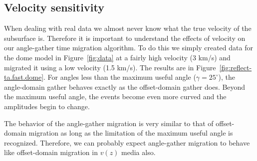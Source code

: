 
\subsection{Velocity sensitivity}

When dealing with real data we almost never know what the true velocity of 
the subsurface is.  Therefore it is important to understand the effects of
velocity on our angle-gather time migration algorithm.  To do this we
simply created data for the dome model in Figure~\ref{fig:data} at a
fairly high velocity (3 km/s) and migrated it using a low velocity (1.5 km/s).
The results are in Figure~\ref{fig:reflect-ta.fast.dome}.  For angles less
than the maximum useful angle ($\gamma=25^{\circ}$), the angle-domain gather
behaves exactly as the offset-domain gather does.  Beyond the maximum
useful angle, the events become even more curved and the amplitudes begin
to change.

The behavior of the angle-gather migration is very similar to that of 
offset-domain migration as long as the limitation of the maximum useful
angle is recognized.  Therefore, we can probably expect angle-gather
migration to behave like offset-domain migration in $v(z)$ media also.  

